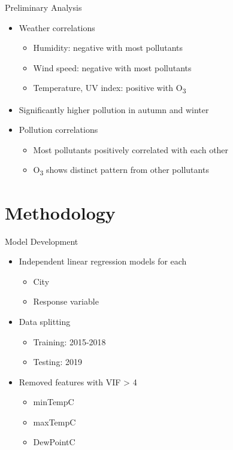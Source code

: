 \documentclass[svgnames, 12pt]{beamer}
\begin{document}
\begin{frame}{Preliminary Analysis}
    \begin{itemize}
       \item Weather correlations
           \begin{itemize}
               \item Humidity: negative with most pollutants
               \item Wind speed: negative with most pollutants
               \item Temperature, UV index: positive with O\textsubscript{3}
           \end{itemize}
       \item Significantly higher pollution in autumn and winter
       \item Pollution correlations
           \begin{itemize}
               \item Most pollutants positively correlated with each other
               \item O\textsubscript{3} shows distinct pattern from other pollutants
           \end{itemize}
    \end{itemize}
\end{frame}

\section{Methodology}

\begin{frame}{Model Development}
\begin{itemize}
    \item Independent linear regression models for each
        \begin{itemize}
            \item City
            \item Response variable
        \end{itemize}
    \item Data splitting
        \begin{itemize}
            \item Training: 2015-2018
            \item Testing: 2019
        \end{itemize}
    \item Removed features with VIF > 4
        \begin{itemize}
            \item minTempC
            \item maxTempC
            \item DewPointC
        \end{itemize}
\end{itemize}
\end{frame}
\end{document}
